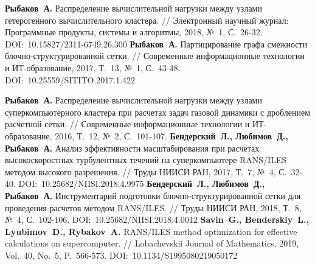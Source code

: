 \begin{thebibliography}{99}
%
%



%
\textbf{Рыбаков~А.} Распределение вычислительной нагрузки между узлами гетерогенного вычислительного кластера. // Электронный научный журнал: Программные продукты, системы и алгоритмы, 2018, №~1, С.~26-32. DOI:~10.15827/2311-6749.26.300
%
\textbf{Рыбаков~А.} Партицирование графа смежности блочно-структурированной сетки. // Современные информационные технологии и ИТ-образование, 2017, Т.~13, №~1, С.~43-48. DOI:~10.25559/SITITO.2017.1.422
%



%
\textbf{Рыбаков~А.} Распределение вычислительной нагрузки между узлами суперкомпьютерного кластера при расчетах задач газовой динамики с дроблением расчетной сетки. // Современные информационные технологии и ИТ-образование, 2016, Т.~12, №~2, С.~101-107.
%
\textbf{Бендерский~Л., Любимов~Д., Рыбаков~А.} Анализ эффективности масштабирования при расчетах высокоскоростных турбулентных течений на суперкомпьютере RANS/ILES методом высокого разрешения. // Труды НИИСИ РАН, 2017, Т.~7, №~4, С.~32-40. DOI:~10.25682/NIISI.2018.4.9975
%
\textbf{Бендерский~Л., Любимов~Д., Рыбаков~А.} Инструментарий подготовки блочно-структурированной сетки для проведения расчетов методом RANS/ILES. // Труды НИИСИ РАН, 2018, Т.~8, №~4, С.~102-106. DOI:~10.25682/NIISI.2018.4.0012
%
\textbf{Savin~G., Benderskiy~L., Lyubimov~D., Rybakov~A.} RANS/ILES method optimization for effective calculations on supercomputer. // Lobachevskii Journal of Mathematics, 2019, Vol.~40, No.~5, P.~566-573. DOI:~10.1134/S1995080219050172
%




\end{thebibliography}
